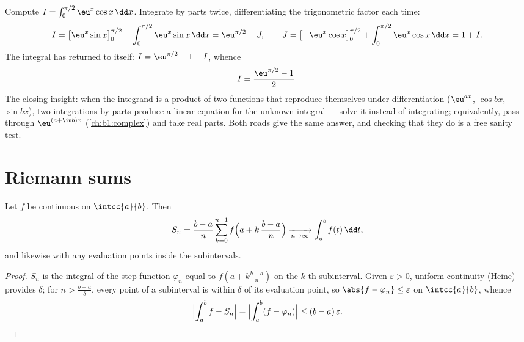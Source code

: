 \begin{example}\label{ex:b1:integration:boomerang}
Compute $I = \int_0^{\pi/2} \eu^x \cos x\,\dd x$. Integrate by
parts twice, differentiating the trigonometric factor each time:
\[
I = \bigl[\eu^x \sin x\bigr]_0^{\pi/2}
- \int_0^{\pi/2} \eu^x \sin x\,\dd x
= \eu^{\pi/2} - J,
\qquad
J = \bigl[-\eu^x\cos x\bigr]_0^{\pi/2}
+ \int_0^{\pi/2} \eu^x\cos x\,\dd x = 1 + I .
\]
The integral has returned to itself: $I = \eu^{\pi/2} - 1 - I$,
whence
\[
I = \frac{\eu^{\pi/2} - 1}{2} .
\]
The closing insight: when the integrand is a product of two
functions that reproduce themselves under differentiation
($\eu^{ax}$, $\cos bx$, $\sin bx$), two integrations by parts
produce a linear equation for the unknown integral --- solve it
instead of integrating; equivalently, pass through
$\eu^{(a + \iu b)x}$ (\cref{ch:b1:complex}) and take real
parts. Both roads give the same answer, and checking that they
do is a free sanity test.
\end{example}

\section{Riemann sums}

\begin{theorem}\label{thm:b1:integration:riemann}
Let $f$ be continuous on $\intcc{a}{b}$. Then
\[
S_n = \frac{b - a}{n} \sum_{k=0}^{n-1}
f\Bigl(a + k\,\frac{b-a}{n}\Bigr)
\xrightarrow[n \to \infty]{} \int_a^b f(t)\, \dd t ,
\]
and likewise with any evaluation points inside the subintervals.
\end{theorem}

\begin{proof}
$S_n$ is the integral of the step function $\varphi_n$ equal to
$f(a + k\frac{b-a}{n})$ on the $k$-th subinterval. Given
$\varepsilon > 0$, uniform continuity (Heine) provides $\delta$; for
$n > \frac{b-a}{\delta}$, every point of a subinterval is within
$\delta$ of its evaluation point, so $\abs{f - \varphi_n} \leq
\varepsilon$ on $\intcc{a}{b}$, whence
\[
\Bigl| \int_a^b f - S_n \Bigr|
= \Bigl| \int_a^b (f - \varphi_n) \Bigr|
\leq (b-a)\,\varepsilon . \qedhere
\]
\end{proof}

